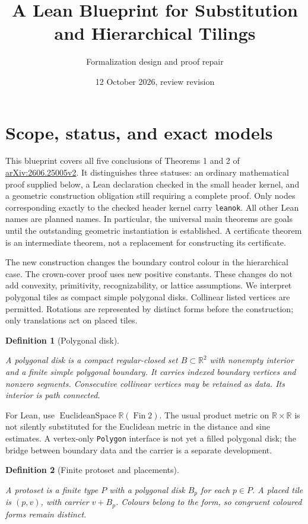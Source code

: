 \documentclass[11pt,a4paper]{article}
\title{A Lean Blueprint for Substitution and Hierarchical Tilings}
\author{Formalization design and proof repair}
\date{12 October 2026, review revision}
\newcommand{\R}{\mathbb R}
\newtheorem{definition}{Definition}[section]
\theoremstyle{remark}
\newcommand{\lean}[1]{}
\newcommand{\uses}[1]{}
\begin{document}
\maketitle
\tableofcontents
\section{Scope, status, and exact models}

This blueprint covers all five conclusions of Theorems 1 and 2 of
\href{https://arxiv.org/abs/2606.25005v2}{arXiv:2606.25005v2}.
It distinguishes three statuses: an ordinary mathematical proof supplied
below, a Lean declaration checked in the small header kernel, and a
geometric construction obligation still requiring a complete proof.
Only nodes corresponding exactly to the checked header kernel carry
\texttt{leanok}. All other Lean names are planned names.
In particular, the universal main theorems are goals until the outstanding
geometric instantiation is established. A certificate theorem is an
intermediate theorem, not a replacement for constructing its certificate.

The new construction changes the boundary control colour in the hierarchical
case. The crown-cover proof uses new positive constants. These changes do
not add convexity, primitivity, recognizability, or lattice assumptions.
We interpret polygonal tiles as compact simple polygonal disks. Collinear
listed vertices are permitted. Rotations are represented by distinct forms
before the construction; only translations act on placed tiles.

\begin{definition}[Polygonal disk]\label{def:polygon}
\lean{Tilings.Geometry.PolygonalDisk}
A polygonal disk is a compact regular-closed set $B\subset\R^2$ with
nonempty interior and a finite simple polygonal boundary. It carries
indexed boundary vertices and nonzero segments. Consecutive collinear
vertices may be retained as data. Its interior is path connected.
\end{definition}

For Lean, use $\operatorname{EuclideanSpace}\R(\operatorname{Fin}2)$.
The usual product metric on $\R\times\R$ is not silently substituted for
the Euclidean metric in the distance and sine estimates. A vertex-only
\texttt{Polygon} interface is not yet a filled polygonal disk; the bridge
between boundary data and the carrier is a separate development.

\begin{definition}[Finite protoset and placements]\label{def:protoset}
\lean{Tilings.Protoset}
\uses{def:polygon}
A protoset is a finite type $P$ with a polygonal disk $B_p$ for each $p\in P$.
A placed tile is $(p,v)$, with carrier $v+B_p$. Colours belong to the form,
so congruent coloured forms remain distinct.
\end{definition}
\end{document}
